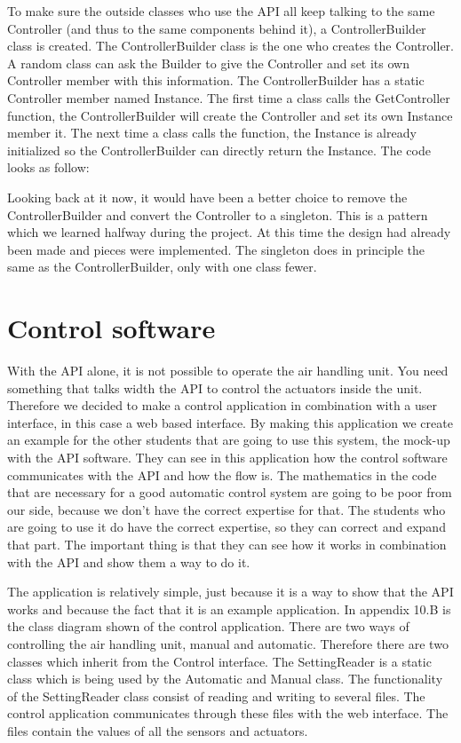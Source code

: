 \documentclass[a4paper,oneside]{book}
\begin{document}


To make sure the outside classes who use the API all keep talking to the same
Controller (and thus to the same components behind it), a ControllerBuilder
class is created. The ControllerBuilder class is the one who creates the
Controller. A random class can ask the Builder to give the Controller and set
its own Controller member with this information. The ControllerBuilder has a
static Controller member named Instance. The first time a class calls the
GetController function, the ControllerBuilder will create the Controller and
set its own Instance member it. The next time a class calls the function, the
Instance is already initialized so the ControllerBuilder can directly return
the Instance. The code looks as follow:



Looking back at it now, it would have been a better choice to remove the
ControllerBuilder and convert the Controller to a singleton. This is a pattern
which we learned halfway during the project. At this time the design had
already been made and pieces were implemented. The singleton does in principle
the same as the ControllerBuilder, only with one class fewer.

\section{Control software}
\label{sec:control}
With the API alone, it is not possible to operate the air handling unit. You
need something that talks width the API to control the actuators inside the
unit. Therefore we decided to make a control application in combination with a
user interface, in this case a web based interface. By making this application
we create an example for the other students that are going to use this system,
the mock-up with the API software. They can see in this application how the
control software communicates with the API and how the flow is. The mathematics
in the code that are necessary for a good automatic control system are going to
be poor from our side, because we don't have the correct expertise for that.
The students who are going to use it do have the correct expertise, so they can
correct and expand that part. The important thing is that they can see how it
works in combination with the API and show them a way to do it.

The application is relatively simple, just because it is a way to show that the
API works and because the fact that it is an example application. In appendix
10.B is the class diagram shown of the control application. There are two ways
of controlling the air handling unit, manual and automatic. Therefore there are
two classes which inherit from the Control interface. The SettingReader is a
static class which is being used by the Automatic and Manual class. The
functionality of the SettingReader class consist of reading and writing to
several files. The control application communicates through these files with
the web interface. The files contain the values of all the sensors and
actuators.
\end{document}
